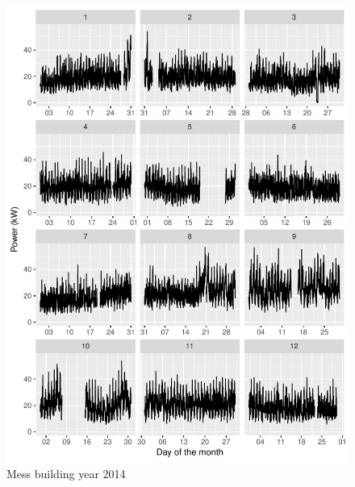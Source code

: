\documentclass[11pt, oneside]{article}   	%
\begin{document}
\begin{figure}
\includegraphics[keepaspectratio]{mess_build_Y2014.pdf}
\caption{Mess building year 2014 }
\end{figure}
\end{document}
